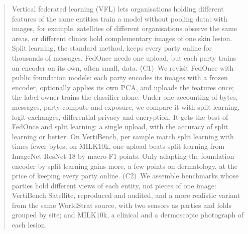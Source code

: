 \begin{abstract}
Vertical federated learning (VFL) lets organisations holding different features of the same entities train a model without pooling data: with images, for example, satellites of different organisations observe the same areas, or different clinics hold complementary images of one skin lesion. Split learning, the standard method, keeps every party online for thousands of messages. FedOnce needs one upload, but each party trains an encoder on its own, often small, data. (C1)~We revisit FedOnce with public foundation models: each party encodes its images with a frozen encoder, optionally applies its own PCA, and uploads the features once; the label owner trains the classifier alone. Under one accounting of bytes, messages, party compute and exposure, we compare it with split learning, logit exchanges, differential privacy and encryption. It gets the best of FedOnce and split learning: a single upload, with the accuracy of split learning or better. On VertiBench, \frVbReachSplitNNFoundBytes{} per sample match split learning with \frVbReachSplitNNFoundRatio{} times fewer bytes; on MILK10k, one upload beats split learning from ImageNet ResNet-18 by \frMilkOneShotOverNonFound{} macro-F1 points. Only adapting the foundation encoder by split learning gains more, a few points on dermatology, at the price of keeping every party online. (C2)~We assemble benchmarks whose parties hold different views of each entity, not pieces of one image: VertiBench Satellite, reproduced and audited, and a more realistic variant from the same WorldStrat source, with two sensors as parties and folds grouped by site; and MILK10k, a clinical and a dermoscopic photograph of each lesion.
\end{abstract}
